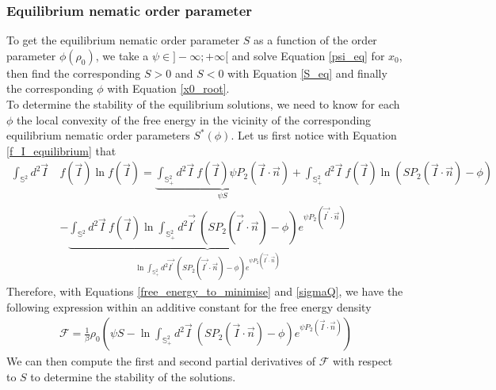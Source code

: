 \documentclass[class=article, float=false, crop=false]{standalone}
\begin{document}
\subsubsection{Equilibrium nematic order parameter}

To get the equilibrium nematic order parameter $S$ as a function of the order parameter $\phi(\rho_0)$, we take a $\psi\in]-\infty;+\infty[$ and solve Equation \ref{psi_eq} for $x_0$, then find the corresponding $S>0$ and $S<0$ with Equation \ref{S_eq} and finally the corresponding $\phi$ with Equation \ref{x0_root}.\\

To determine the stability of the equilibrium solutions, we need to know for each $\phi$ the local convexity of the free energy in the vicinity of the corresponding equilibrium nematic order parameters $S^*(\phi)$. Let us first notice with Equation \ref{f_I_equilibrium} that
\begin{align*}
\int_{\mathbb{S}^2}d^2\vec{I}~&f(\vec{I})\ln f(\vec{I}) = \underbrace{\int_{\mathbb{S}^2_+} d^2\vec{I}~ f(\vec{I})\psi P_2(\vec{I}\cdot\vec{n})}_{\psi S} + \int_{\mathbb{S}^2_+} d^2\vec{I}~ f(\vec{I})\ln(SP_2(\vec{I}\cdot\vec{n})-\phi)\\
&- \underbrace{\int_{\mathbb{S}^2}d^2\vec{I}~ f(\vec{I}) \ln\int_{\mathbb{S}^2_+}d^2\vec{I^{\prime}}~(SP_2(\vec{I^{\prime}}\cdot\vec{n})-\phi)e^{\psi P_2(\vec{I^{\prime}}\cdot\vec{n})}}_{\ln\int_{\mathbb{S}^2_+}d^2\vec{I^{\prime}}~(SP_2(\vec{I^{\prime}}\cdot\vec{n})-\phi)e^{\psi P_2(\vec{I^{\prime}}\cdot\vec{n})}}
\end{align*}
Therefore, with Equations \ref{free_energy_to_minimise} and \ref{sigmaQ}, we have the following expression within an additive constant for the free energy density
\begin{equation}
\begin{aligned}
\mathcal{F} = \frac{1}{\beta}\rho_0\left(\psi S - \ln\int_{\mathbb{S}^2_+}d^2\vec{I}~(SP_2(\vec{I}\cdot\vec{n})-\phi)e^{\psi P_2(\vec{I}\cdot\vec{n})}\right)
\end{aligned}
\label{free_energy_for_curvature}
\end{equation}
We can then compute the first and second partial derivatives of $\mathcal{F}$ with respect to $S$ to determine the stability of the solutions.\\
\end{document}
